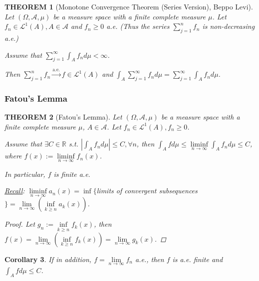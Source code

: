 \documentclass[12pt]{article}
\theoremstyle{blueplain}
\newtheorem{theorem}{THEOREM}[section]
\newtheorem{corollary}[theorem]{Corollary}
\theoremstyle{bluedef}
\theoremstyle{blueremark}
\newcommand{\R}{\mathbb{R}}
\numberwithin{equation}{section}
\begin{document}
\begin{theorem}[Monotone Convergence Theorem (Series Version), Beppo Levi]

  Let $(\Omega, \mathcal{A}, \mu)$ be a measure space with a finite complete measure $\mu$. Let $f_n \in \mathcal{L}^1(A), A \in \mathcal{A}$ and $f_n \geq 0$ a.e. (Thus  the series $\sum_{j=1}^n f_n$ is non-decreasing a.e.)

  Assume that $\sum_{j=1}^\infty \int_A f_n d\mu < \infty$.

  Then $\sum_{j=1}^n f_n \overset{\text{a.e.}}{\rightarrow} f \in \mathcal{L}^1(A)$ and $\int_A \sum_{j=1}^\infty f_n d\mu = \sum_{j=1}^\infty \int_A f_n d\mu$.
\end{theorem}

\subsubsection{Fatou's Lemma}

\begin{theorem}[Fatou's Lemma]

  Let $(\Omega, \mathcal{A}, \mu)$ be a measure space with a finite complete measure $\mu$, $A \in \mathcal{A}$. Let $f_n \in \mathcal{L}^1(A), f_n \geq 0$.

  Assume that $\exists C \in \R$ s.t. $|\int_A f_n d\mu| \leq C, \forall n$, then $\int_A f d\mu \leq \liminf\limits_{n \to \infty} \int_A f_n d\mu \leq C$, where $f(x) := \liminf\limits_{n \to \infty} f_n(x)$.

  In particular, $f$ is finite a.e.

  \underline{Recall}: $\liminf\limits_{n \to \infty} a_n(x) = \inf \{$limits of convergent subsequences$\} = \lim\limits_{n \to \infty} (\inf\limits_{k \geq n} a_k(x))$.

  \begin{proof}
    Let $g_n := \inf\limits_{k \geq n} f_k(x)$, then $f(x) = \lim\limits_{n \to \infty} (\inf\limits_{k \geq n} f_k(x)) = \lim\limits_{n \to \infty} g_k(x)$.




  \end{proof}
\end{theorem}

\begin{corollary}
  If in addition, $f = \lim\limits_{n \to \infty} f_n$ a.e., then $f$ is a.e. finite and $\int_A f d\mu \leq C$.
\end{corollary}
\end{document}
